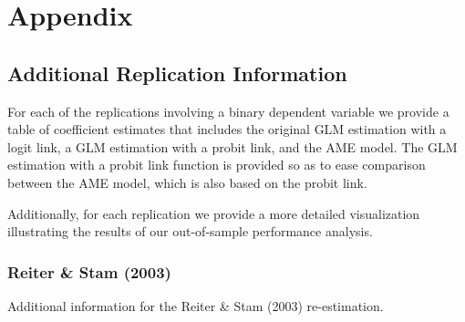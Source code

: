 \clearpage

\renewcommand{\thefigure}{A\arabic{figure}}
\setcounter{figure}{0}
\renewcommand{\thetable}{A.\arabic{table}}
\setcounter{table}{0}
\renewcommand{\thesection}{A.\arabic{section}}
\setcounter{section}{0}

\section*{\textbf{Appendix}}

\subsection*{Additional Replication Information}

For each of the replications involving a binary dependent variable we provide a table of coefficient estimates that includes the original GLM estimation with a logit link, a GLM estimation with a probit link, and the AME model. The GLM estimation with a probit link function is provided so as to ease comparison between the AME model, which is also based on the probit link. %

Additionally, for each replication we provide a more detailed visualization illustrating the results of our out-of-sample performance analysis. %

\clearpage
\subsubsection*{Reiter \& Stam (2003)}

Additional information for the Reiter \& Stam (2003) re-estimation.


\FloatBarrier

